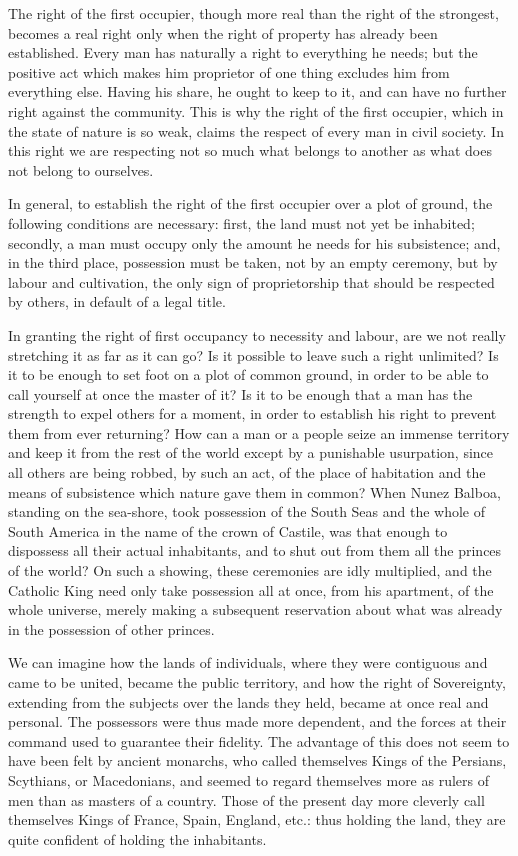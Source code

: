 \documentclass[12pt]{book}
\begin{document}
The right of the first occupier, though more real than the right of the strongest, becomes a real right only when the right of property has already been established. Every man has naturally a right to everything he needs; but the positive act which makes him proprietor of one thing excludes him from everything else. Having his share, he ought to keep to it, and can have no further right against the community. This is why the right of the first occupier, which in the state of nature is so weak, claims the respect of every man in civil society. In this right we are respecting not so much what belongs to another as what does not belong to ourselves.

In general, to establish the right of the first occupier over a plot of ground, the following conditions are necessary: first, the land must not yet be inhabited; secondly, a man must occupy only the amount he needs for his subsistence; and, in the third place, possession must be taken, not by an empty ceremony, but by labour and cultivation, the only sign of proprietorship that should be respected by others, in default of a legal title.

In granting the right of first occupancy to necessity and labour, are we not really stretching it as far as it can go? Is it possible to leave such a right unlimited? Is it to be enough to set foot on a plot of common ground, in order to be able to call yourself at once the master of it? Is it to be enough that a man has the strength to expel others for a moment, in order to establish his right to prevent them from ever returning? How can a man or a people seize an immense territory and keep it from the rest of the world except by a punishable usurpation, since all others are being robbed, by such an act, of the place of habitation and the means of subsistence which nature gave them in common? When Nunez Balboa, standing on the sea-shore, took possession of the South Seas and the whole of South America in the name of the crown of Castile, was that enough to dispossess all their actual inhabitants, and to shut out from them all the princes of the world? On such a showing, these ceremonies are idly multiplied, and the Catholic King need only take possession all at once, from his apartment, of the whole universe, merely making a subsequent reservation about what was already in the possession of other princes.

We can imagine how the lands of individuals, where they were contiguous and came to be united, became the public territory, and how the right of Sovereignty, extending from the subjects over the lands they held, became at once real and personal. The possessors were thus made more dependent, and the forces at their command used to guarantee their fidelity. The advantage of this does not seem to have been felt by ancient monarchs, who called themselves Kings of the Persians, Scythians, or Macedonians, and seemed to regard themselves more as rulers of men than as masters of a country. Those of the present day more cleverly call themselves Kings of France, Spain, England, etc.: thus holding the land, they are quite confident of holding the inhabitants.
\end{document}
